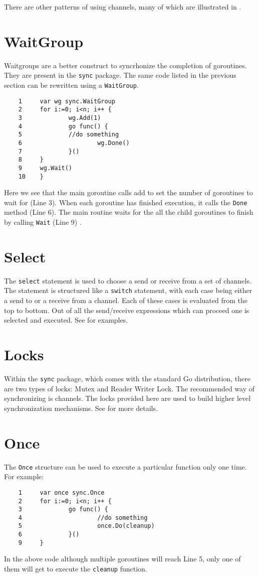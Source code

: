 \documentclass[8pt, twocolumn]{article}
\begin{document}
There are other patterns of using channels, many of
which are illustrated in \cite{effectivego}.
\section{WaitGroup}
Waitgroups are a better construct to syncrhonize the completion of
goroutines. They are present in the \verb=sync= package. The same code
listed in the previous section can be rewritten using a
\verb=WaitGroup=. 
\begin{verbatim}
    1     var wg sync.WaitGroup
    2     for i:=0; i<n; i++ {
    3             wg.Add(1)
    4             go func() {
    5             //do something
    6                     wg.Done()
    7             }()
    8     }
    9     wg.Wait()
    10    } 
\end{verbatim}
Here we see that the main goroutine calls add to set the number of
goroutines to wait for (Line 3). When each goroutine has finished execution, it
calls the \verb=Done= method (Line 6). The main routine waits for the
all the child goroutines to finish by calling \verb=Wait= (Line 9) \cite{sync}.

\section{Select}
The \verb=select= statement is used to choose a send or receive from a
set of channels. The statement is structured like a \verb=switch=
statement, with each case being either a send to or a receive from a
channel. Each of these cases is evaluated from the top to bottom. Out
of all the send/receive expressions which can proceed one is selected
and executed. See \cite{golangspec} for examples.
\section{Locks}
Within the \verb=sync= package, which comes with the standard Go
distribution, there are two types of locks: Mutex and Reader Writer
Lock. The recommended way of synchronizing is channels. The locks
provided here are used to build higher level synchronization
mechanisms. See \cite{sync} for more details.
\section{Once}
The \verb=Once= structure can be used to execute a particular function
only one time. For example:
\begin{verbatim}
    1     var once sync.Once
    2     for i:=0; i<n; i++ {
    3             go func() {
    4                     //do something
    5                     once.Do(cleanup)
    6             }()
    9     }
\end{verbatim}
In the above code although multiple goroutines will reach Line 5, only
one of them will get to execute the \verb=cleanup= function.
\end{document}
